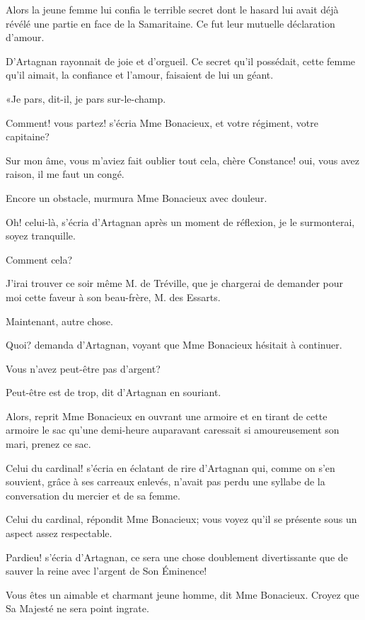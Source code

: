 Alors la jeune femme lui confia le terrible secret dont le hasard lui avait déjà révélé une partie en face de la Samaritaine. Ce fut leur mutuelle déclaration d'amour. 

D'Artagnan rayonnait de joie et d'orgueil. Ce secret qu'il possédait, cette femme qu'il aimait, la confiance et l'amour, faisaient de lui un géant. 

«Je pars, dit-il, je pars sur-le-champ. 

\speak  Comment! vous partez! s'écria Mme Bonacieux, et votre régiment, votre capitaine? 

\speak  Sur mon âme, vous m'aviez fait oublier tout cela, chère Constance! oui, vous avez raison, il me faut un congé. 

\speak  Encore un obstacle, murmura Mme Bonacieux avec douleur. 

\speak  Oh! celui-là, s'écria d'Artagnan après un moment de réflexion, je le surmonterai, soyez tranquille. 

\speak  Comment cela? 

\speak  J'irai trouver ce soir même M. de Tréville, que je chargerai de demander pour moi cette faveur à son beau-frère, M. des Essarts. 

\speak  Maintenant, autre chose. 

\speak  Quoi? demanda d'Artagnan, voyant que Mme Bonacieux hésitait à continuer. 

\speak  Vous n'avez peut-être pas d'argent? 

\speak  Peut-être est de trop, dit d'Artagnan en souriant. 

\speak  Alors, reprit Mme Bonacieux en ouvrant une armoire et en tirant de cette armoire le sac qu'une demi-heure auparavant caressait si amoureusement son mari, prenez ce sac. 

\speak  Celui du cardinal! s'écria en éclatant de rire d'Artagnan qui, comme on s'en souvient, grâce à ses carreaux enlevés, n'avait pas perdu une syllabe de la conversation du mercier et de sa femme. 

\speak  Celui du cardinal, répondit Mme Bonacieux; vous voyez qu'il se présente sous un aspect assez respectable. 

\speak  Pardieu! s'écria d'Artagnan, ce sera une chose doublement divertissante que de sauver la reine avec l'argent de Son Éminence! 

\speak  Vous êtes un aimable et charmant jeune homme, dit Mme Bonacieux. Croyez que Sa Majesté ne sera point ingrate. 

